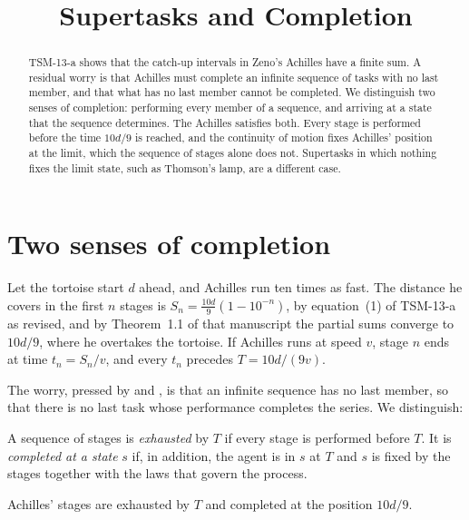 \documentclass{situationist-preprint}
\title{Supertasks and Completion}
\begin{document}
\maketitle

\begin{abstract}
TSM-13-a shows that the catch-up intervals in Zeno's Achilles have a finite sum. A residual worry is that Achilles must complete an infinite sequence of tasks with no last member, and that what has no last member cannot be completed. We distinguish two senses of completion: performing every member of a sequence, and arriving at a state that the sequence determines. The Achilles satisfies both. Every stage is performed before the time $10d/9$ is reached, and the continuity of motion fixes Achilles' position at the limit, which the sequence of stages alone does not. Supertasks in which nothing fixes the limit state, such as Thomson's lamp, are a different case.
\end{abstract}

\section{Two senses of completion}

Let the tortoise start $d$ ahead, and Achilles run ten times as fast. The distance he covers in the first $n$ stages is $S_n = \tfrac{10d}{9}(1 - 10^{-n})$, by equation~(1) of TSM-13-a as revised, and by Theorem~1.1 of that manuscript the partial sums converge to $10d/9$, where he overtakes the tortoise. If Achilles runs at speed $v$, stage $n$ ends at time $t_n = S_n / v$, and every $t_n$ precedes $T = 10d/(9v)$.

The worry, pressed by \citet{Black1951} and \citet{Thomson1954}, is that an infinite sequence has no last member, so that there is no last task whose performance completes the series. We distinguish:

\begin{definition}[Completion]\label{d:comp}
A sequence of stages is \emph{exhausted} by $T$ if every stage is performed before $T$. It is \emph{completed at a state} $s$ if, in addition, the agent is in $s$ at $T$ and $s$ is fixed by the stages together with the laws that govern the process.
\end{definition}

\begin{proposition}\label{p:ach}
Achilles' stages are exhausted by $T$ and completed at the position $10d/9$.
\end{proposition}
\end{document}

